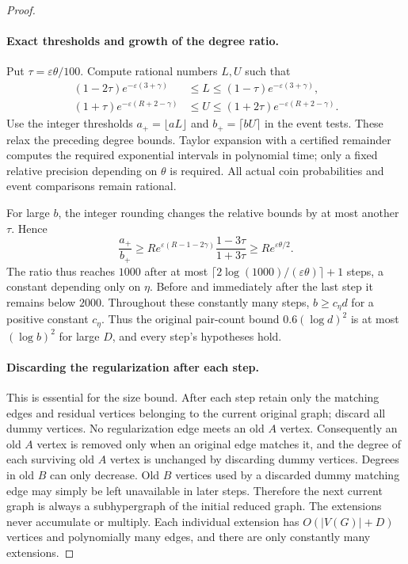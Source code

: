 \documentclass[11pt]{article}
\theoremstyle{definition}\newtheorem{algorithm}{Algorithm}[section]
\numberwithin{equation}{section}
\theoremstyle{remark}\newtheorem*{remark}{Remark}
\begin{document}
\begin{proof}
\paragraph{Exact thresholds and growth of the degree ratio.}
Put $\tau=\varepsilon\theta/100$. Compute rational numbers $L,U$
such that
\begin{align*}
 (1-2\tau)e^{-\varepsilon(3+\gamma)}
 &\le L\le(1-\tau)e^{-\varepsilon(3+\gamma)},\\
 (1+\tau)e^{-\varepsilon(R+2-\gamma)}
 &\le U\le(1+2\tau)e^{-\varepsilon(R+2-\gamma)}.
\end{align*}
Use the integer thresholds $a_+=\lfloor aL\rfloor$ and
$b_+=\lceil bU\rceil$ in the event tests. These relax the preceding
degree bounds. Taylor expansion with a certified remainder computes
the required exponential intervals in polynomial time; only a fixed
relative precision depending on $\theta$ is required. All actual
coin probabilities and event comparisons remain rational.

For large $b$, the integer rounding changes the relative bounds by
at most another $\tau$. Hence
\[
 \frac{a_+}{b_+}
 \ge R e^{\varepsilon(R-1-2\gamma)}
          \frac{1-3\tau}{1+3\tau}
 \ge R e^{\varepsilon\theta/2}.
\]
The ratio thus reaches $1000$ after at most
$\lceil2\log(1000)/(\varepsilon\theta)\rceil+1$ steps, a constant
depending only on $\eta$. Before and immediately after the last step
it remains below $2000$. Throughout these constantly many steps,
$b\ge c_{\eta}d$ for a positive constant $c_{\eta}$. Thus the
original pair-count bound $0.6(\log d)^2$ is at most
$(\log b)^2$ for large $D$, and every step's hypotheses hold.

\paragraph{Discarding the regularization after each step.}
This is essential for the size bound. After each step retain only
the matching edges and residual vertices belonging to the current
original graph; discard all dummy vertices. No regularization edge
meets an old $A$ vertex. Consequently an old $A$ vertex is removed
only when an original edge matches it, and the degree of each surviving
old $A$ vertex is unchanged by discarding dummy vertices. Degrees
in old $B$ can only decrease. Old $B$ vertices used by a discarded
dummy matching edge may simply be left unavailable in later steps.
Therefore the next current graph is always a subhypergraph of the
initial reduced graph. The extensions never accumulate or multiply.
Each individual extension has $O(|V(G)|+D)$ vertices and polynomially
many edges, and there are only constantly many extensions.


\end{proof}
\end{document}
